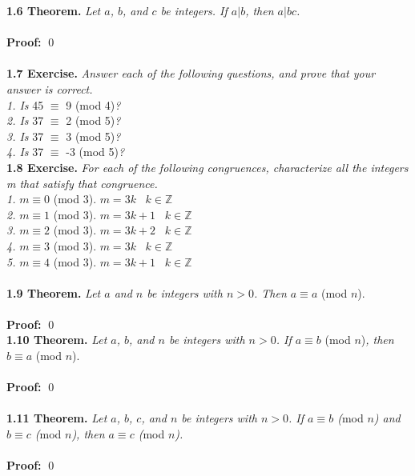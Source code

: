 \documentclass[12pt]{article}
\begin{document}
\noindent \textbf{1.6 Theorem.} 
\emph{Let $a$, $b$, and $c$ be integers. If $a \vert b$, 
then $a \vert bc$.}
~\\
~\\
\textbf{Proof:}
 \qed
~\\
~\\

\noindent \textbf{1.7 Exercise.} \emph{Answer each of the following questions, 
and prove that your answer is correct.}
~\\
\emph{1. Is} 45 $\equiv$ 9 (mod 4)\emph{?} 
~\\
\emph{2. Is} 37 $\equiv$ 2 (mod 5)\emph{?} 
~\\
\emph{3. Is} 37 $\equiv$ 3 (mod 5)\emph{?} 
~\\
\emph{4. Is} 37 $\equiv$ -3 (mod 5)\emph{?}
~\\

\noindent \textbf{1.8 Exercise.} \emph{For each of the following congruences, 
characterize all the integers m that satisfy that congruence.}
~\\
\emph{1.} $m \equiv 0$ (mod 3). \; $m = 3k \; \; \; k \in \mathbb{Z}$
~\\
\emph{2.} $m \equiv 1$ (mod 3). \; $m = 3k + 1 \; \; \; k \in \mathbb{Z}$
~\\
\emph{3.} $m \equiv 2$ (mod 3). \; $m = 3k + 2 \; \; \; k \in \mathbb{Z}$
~\\
\emph{4.} $m \equiv 3$ (mod 3). \; $m = 3k \; \; \; k \in \mathbb{Z}$
~\\
\emph{5.} $m \equiv 4$ (mod 3). \; $m = 3k + 1 \; \; \; k \in \mathbb{Z}$
~\\
~\\

\noindent \textbf{1.9 Theorem.} \emph{Let $a$ and $n$ be integers with $n > 0$.
Then $a \equiv a$} (mod $n$). 
~\\
~\\
\textbf{Proof:} 
\qed
\newpage
~\\

\noindent \textbf{1.10 Theorem.} \emph{Let $a$, $b$, and $n$ be integers with $n>0$. 
If $a \equiv b$} (mod $n$)\emph{, then $b \equiv a$} (mod $n$).
~\\
~\\
\textbf{Proof:} 
 \qed
~\\
~\\

\noindent \textbf{1.11 Theorem.} \emph{Let $a$, $b$, $c$, and $n$ be integers with $n>0$. 
If $a \equiv b$ (}mod\emph{ $n$) and $b \equiv c$ (}mod\emph{ $n$), then $a \equiv c$ 
(}mod\emph{ $n$).}
~\\
~\\
\textbf{Proof:}  \qed
\end{document}
